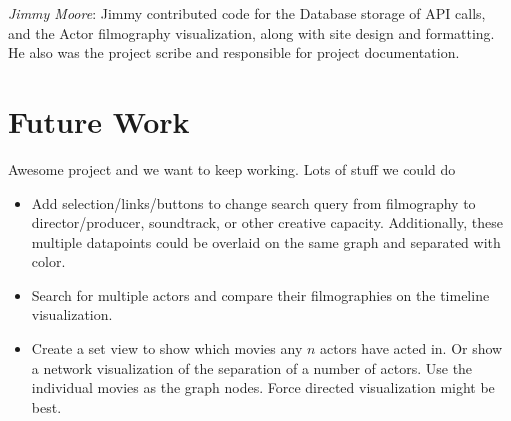 \documentclass[12pt]{article}
\begin{document}
\textit{Jimmy Moore}: Jimmy contributed code for the Database storage of API calls, and the Actor filmography visualization, along with site design and formatting.  He also was the project scribe and responsible for project documentation.

\newpage

\section{Future Work}


Awesome project and we want to keep working.  Lots of stuff we could do

\begin{itemize}
	\item Add selection/links/buttons to change search query from filmography to director/producer, soundtrack, or other creative capacity.  Additionally, these multiple datapoints could be overlaid on the same graph and separated with color.
	\item Search for multiple actors and compare their filmographies on the timeline visualization.
	\item Create a set view to show which movies any $n$ actors have acted in.  Or show a network visualization of the separation of a number of actors.  Use the individual movies as the graph nodes.  Force directed visualization might be best.
\end{itemize}
\end{document}
